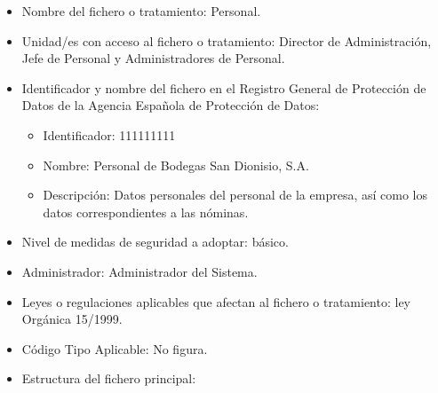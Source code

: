\documentclass[a4paper,11pt,bibtotoc,noliststotoc]{scrbook}
\newcommand{\laorganizacion}{Bodegas San Dionisio, S.A.}
\begin{document}
\begin{itemize}
\item Nombre del fichero o tratamiento: Personal.

\item Unidad/es con acceso al fichero o tratamiento: Director de Administración, Jefe de Personal y Administradores de Personal.

\item Identificador y nombre del fichero en el Registro General de Protección de Datos de la Agencia Española de Protección de Datos:

	\begin{itemize}
	\item Identificador: 111111111
	\item Nombre: Personal de \laorganizacion
	\item Descripción: Datos personales del personal de la empresa, así como los datos correspondientes a las nóminas.
	\end{itemize}

\item Nivel de medidas de seguridad a adoptar: básico.

\item Administrador: Administrador del Sistema.

\item Leyes o regulaciones aplicables que afectan al fichero o tratamiento: ley Orgánica 15/1999.

\item Código Tipo Aplicable: No figura.

\item Estructura del fichero principal: 


\end{itemize}
\end{document}

